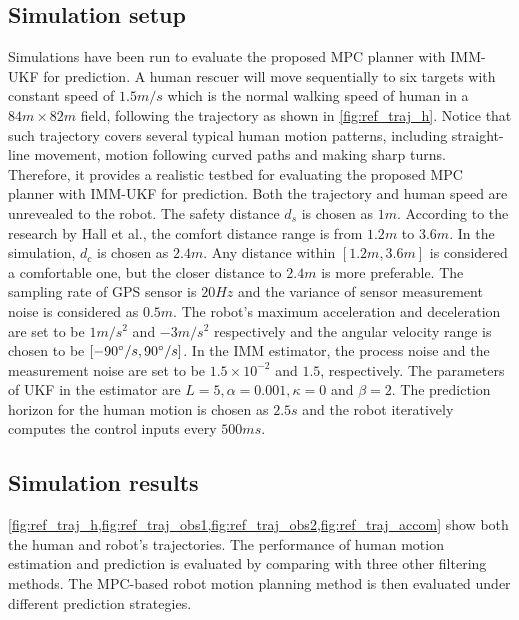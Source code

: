 \documentclass[letterpaper, 10 pt, conference]{ieeeconf}
\begin{document}
	\subsection{Simulation setup}
	Simulations have been run to evaluate the proposed MPC planner with IMM-UKF for prediction.
	A human rescuer will move sequentially to six targets with constant speed of $1.5m/s$ which is the normal walking speed of human in a $84 m\times 82 m$ field, following the trajectory as shown in \cref{fig:ref_traj_h}.
	Notice that such trajectory covers several typical human motion patterns, including straight-line movement, motion following curved paths and making sharp turns.
	Therefore, it provides a realistic testbed for evaluating the proposed MPC planner with IMM-UKF for prediction.
	Both the trajectory and human speed are unrevealed to the robot.
	The safety distance $d_s$ is chosen as $1m$.
	According to the research by Hall et al.\cite{hall1968proxemics}, the comfort distance range is from $1.2m$ to $3.6m$.
	In the simulation, $d_c$ is chosen as $2.4m$.
	Any distance within $[1.2m,3.6m]$ is considered a comfortable one, but the closer distance to $2.4m$ is more preferable.
	The sampling rate of GPS sensor is $20Hz$ and the variance of sensor measurement noise is considered as $0.5m$. 
	The robot's maximum acceleration and deceleration are set to be $1 m/s^2$ and $-3 m/s^2$ respectively and the angular velocity range is chosen to be $[-90\degree/s,90\degree/s]$.
	In the IMM estimator, the process noise and the measurement noise are set to be $1.5\times 10^{-2}$ and $1.5$, respectively. The parameters of UKF in the estimator are $L=5,\alpha=0.001, \kappa=0$ and $\beta=2$.
	The prediction horizon for the human motion is chosen as $2.5s$ and the robot iteratively computes the control inputs every $500ms$.
	
	\subsection{Simulation results}
	\cref{fig:ref_traj_h,fig:ref_traj_obs1,fig:ref_traj_obs2,fig:ref_traj_accom} show both the human and robot's trajectories.	
	The performance of human motion estimation and prediction is evaluated by comparing with three other filtering methods. 
	The MPC-based robot motion planning method is then evaluated under different prediction strategies.
\end{document}
